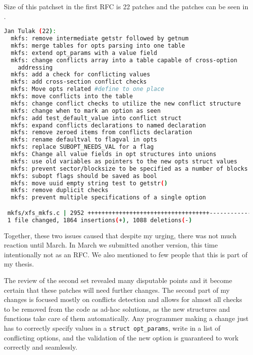 \begin{desciption}
Size of this patchset in the first RFC is 22 patches and the patches can be
seen in .
\begin{lstlisting}[frame=none, basicstyle=\footnotesize\ttfamily,
language=Bash, numbers=none, numberstyle=\tiny\color{black},caption= {Git
statistics for the second patchset~\cite{secondSetRFC}.},
label={lst:refactoring:secondSet}]
Jan Tulak (22):
  mkfs: remove intermediate getstr followed by getnum
  mkfs: merge tables for opts parsing into one table
  mkfs: extend opt_params with a value field
  mkfs: change conflicts array into a table capable of cross-option
    addressing
  mkfs: add a check for conflicting values
  mkfs: add cross-section conflict checks
  mkfs: Move opts related #define to one place
  mkfs: move conflicts into the table
  mkfs: change conflict checks to utilize the new conflict structure
  mkfs: change when to mark an option as seen
  mkfs: add test_default_value into conflict struct
  mkfs: expand conflicts declarations to named declaration
  mkfs: remove zeroed items from conflicts declaration
  mkfs: rename defaultval to flagval in opts
  mkfs: replace SUBOPT_NEEDS_VAL for a flag
  mkfs: Change all value fields in opt structures into unions
  mkfs: use old variables as pointers to the new opts struct values
  mkfs: prevent sector/blocksize to be specified as a number of blocks
  mkfs: subopt flags should be saved as bool
  mkfs: move uuid empty string test to getstr()
  mkfs: remove duplicit checks
  mkfs: prevent multiple specifications of a single option

 mkfs/xfs_mkfs.c | 2952 +++++++++++++++++++++++++++++++++++--------------------
 1 file changed, 1864 insertions(+), 1088 deletions(-)

\end{lstlisting}

Together, these two issues caused that despite my urging, there was not much
reaction until March. In March we submitted another version, this time
intentionally not as an RFC. We also mentioned to few people that this is
part of my thesis.

The review of the second set revealed many disputable points and it become
certain that these patches will need further changes. The second part of
my changes is focused mostly on conflicts detection and allows for almost
all checks to be removed from the code as ad-hoc solutions, as the new
structures and functions take care of them automatically. Any programmer
making a change just has to correctly specify values in a {\tt struct
opt\_params}, write in a list of conflicting options, and the validation of
the new option is guaranteed to work correctly and seamlessly.


\end{desciption}

